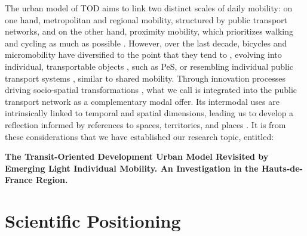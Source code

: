 \begin{refsegment}
The urban model of \acrshort{TOD} aims to link two distinct scales of daily mobility: on one hand, metropolitan and regional mobility, structured by public transport networks, and on the other hand, proximity mobility, which prioritizes walking and cycling as much as possible \textcolor{blue}{\autocites[81]{conesa_modelisation_2010}[124]{lo_feudo_scenario_2014}}. However, over the last decade, bicycles and micromobility have diversified to the point that they tend to , evolving into individual, transportable objects \textcolor{blue}{\autocite[20]{amar_du_2012}}, such as \acrfull{PeS}, or resembling individual public transport systems \textcolor{blue}{\autocites[179]{amar_homo_2010}[4]{castex_prise_2017}}, similar to shared mobility. Through innovation processes driving socio-spatial transformations \textcolor{blue}{\autocite[89]{ageron_intermodalite-voyageurs_2013}}, what we call  is integrated into the public transport network as a complementary modal offer. Its intermodal uses are intrinsically linked to temporal and spatial dimensions, leading us to develop a reflection informed by references to spaces, territories, and places \textcolor{blue}{\autocite[4]{sebban_complementarite_2003}}. It is from these considerations that we have established our research topic, entitled:
    \begin{displayquote}
\textbf{The Transit-Oriented Development Urban Model Revisited by Emerging Light Individual Mobility. An Investigation in the Hauts-de-France Region.}
    \end{displayquote}%

\section*{Scientific Positioning
    \label{introduction-generale:positionnement-scientifique}
    }


\end{refsegment}
